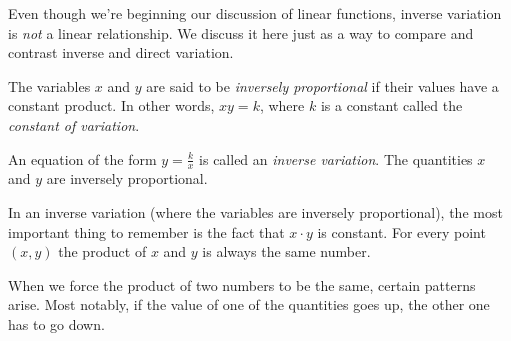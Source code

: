 \begin{boxedwarning}
Even though we're beginning our discussion of linear functions, inverse variation is \textit{not} a linear relationship. We discuss it here just as a way to compare and contrast inverse and direct variation.
\end{boxedwarning}


\begin{boxeddef}
The variables $x$ and $y$ are said to be \textit{inversely proportional} if their values have a constant product. In other words, $xy = k$, where $k$ is a constant called the \textit{constant of variation}.

An equation of the form $y = \frac{k}{x}$ is called an \textit{inverse variation}. The quantities $x$ and $y$ are inversely proportional.
\end{boxeddef}

In an inverse variation (where the variables are inversely proportional), the most important thing to remember is the fact that $x \cdot y$ is constant. For every point $(x, y)$ the product of $x$ and $y$ is always the same number.

When we force the product of two numbers to be the same, certain patterns arise. Most notably, if the value of one of the quantities goes up, the other one has to go down.

%

